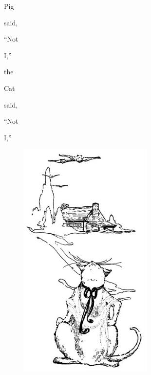 \documentclass[letterpaper, 10pt, openany]{memoir}
\begin{document}
Pig

\vspace{\onelineskip}

said,

\vspace{\onelineskip}

``Not

\vspace{\onelineskip}

I,''

\vspace{2\onelineskip}

the

\vspace{\onelineskip}

Cat

\vspace{\onelineskip}

said,

\vspace{\onelineskip}

``Not

\vspace{\onelineskip}

I,''

\newpage
\begin{figure}
	\includegraphics[width=0.6\textwidth]{image_024.jpg}
\end{figure}
\end{document}
